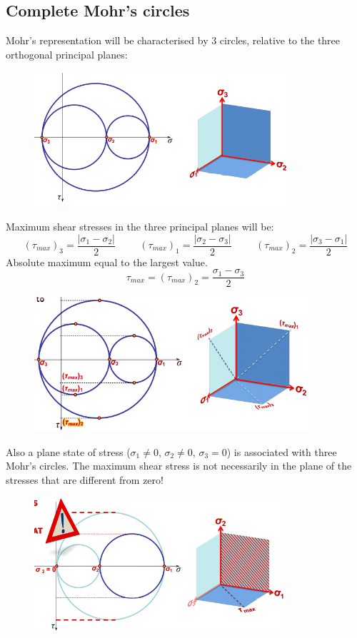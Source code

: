 \documentclass[class=report, crop=false, 12pt,a4paper]{standalone}
\begin{document}
\subsection{Complete Mohr's circles}
Mohr's representation will be characterised by 3 circles, relative to the three orthogonal principal planes: 
\begin{figure}[H]
    \centering
    \includegraphics[height = 5cm]{../img/diagram64.png}
    \caption{}
\end{figure}
Maximum shear stresses in the three principal planes will be:
\begin{equation}
    (\tau_{max})_3 = \frac{|\sigma_1 - \sigma_2|}{2} \hspace{1cm} (\tau_{max})_1 = \frac{|\sigma_2 - \sigma_3 |}{2} \hspace{1cm} (\tau_{max})_2 = \frac{|\sigma_3 - \sigma_1 |}{2}
\end{equation}
Absolute maximum equal to the largest value.
\begin{equation}
    \tau_{max} = (\tau_{max})_2 = \frac{\sigma_1 - \sigma_3}{2}
\end{equation}
\begin{figure}[H]
    \centering
    \includegraphics[height = 5cm]{../img/diagram65.png}
    \caption{}
\end{figure}
Also a plane state of stress ($\sigma_1 \neq 0, \, \sigma_2 \neq 0, \, \sigma_3 = 0$) is associated with three Mohr's circles. The maximum shear stress is not necessarily in the plane of the stresses that are different from zero!
\begin{figure}[H]
    \centering
    \includegraphics[height = 5cm]{../img/diagram66.png}
    \caption{}
\end{figure}
\end{document}

